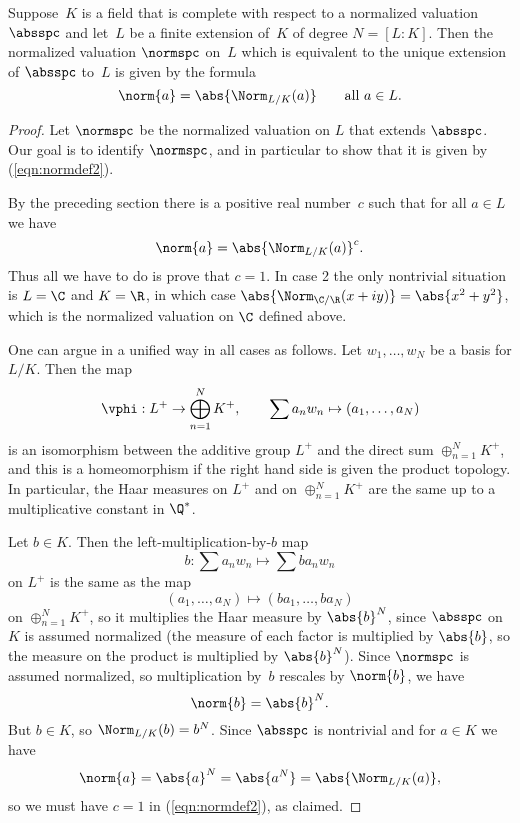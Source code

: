 \documentclass[11pt]{book}
\begin{document}
\begin{ch}
\begin{lemma}
  Suppose~$K$ is a field that is complete with respect to a normalized
  valuation~$\absspc$ and let~$L$ be a finite extension of~$K$ of
  degree $N=[L:K]$.  Then the normalized valuation $\normspc$ on~$L$
  which is equivalent to the unique extension of $\absspc$ to~$L$ is
  given by the formula
\begin{equation}\label{eqn:normdef2}
 \norm{a} = \abs{\Norm_{L/K}(a)}\qquad \text{all } a\in L.
\end{equation}
\end{lemma}
\begin{proof}
Let $\normspc$ be the normalized valuation on $L$ that extends $\absspc$.
Our goal is to identify $\normspc$, and in particular to show
that it is given by (\ref{eqn:normdef2}).

By the preceding section there is a positive real number~$c$
such that for all $a\in L$ we have
$$\norm{a} = \abs{\Norm_{L/K}(a)}^c.$$
Thus all we have to do is prove that $c=1$.
In case 2 the only nontrivial situation is $L=\C$ and $K=\R$,
in which case $\abs{\Norm_{\C/\R}(x+iy)} = \abs{x^2+y^2}$,
which is the normalized valuation on $\C$ defined above.

One can argue in a unified way in all cases as follows.
Let $w_1,\ldots, w_N$ be a basis for $L/K$. Then the map
$$
  \vphi:L^+ \to \bigoplus_{n=1}^N K^+, \qquad
\sum a_n w_n \mapsto (a_1,\ldots, a_N)
$$
is an isomorphism between the additive group $L^+$
and the direct sum $\oplus_{n=1}^N K^+$, and
this is a homeomorphism if the right hand side
is given the product topology.  In particular, the
Haar measures on $L^+$ and on $\oplus_{n=1}^N K^+$
are the same up to a multiplicative constant in $\Q^*$.

Let $b\in K$.  Then the left-multiplication-by-$b$ map
$$
   b : \sum a_n w_n \mapsto \sum b a_n w_n
$$
on $L^+$ is the same as the map
$$
  (a_1,\ldots, a_N) \mapsto (ba_1,\ldots, ba_N)
$$
on $\oplus_{n=1}^N K^+$, so it multiplies the Haar
measure by $\abs{b}^N$, since $\absspc$ on~$K$
is assumed normalized (the measure of each factor
is multiplied by $\abs{b}$, so the measure on
the product is multiplied by $\abs{b}^N$).
Since $\normspc$ is assumed normalized, so
multiplication by~$b$ rescales by $\norm{b}$, we
have
$$
  \norm{b} = \abs{b}^N.
$$
But $b\in K$, so $\Norm_{L/K}(b) = b^N$.
Since $\absspc$ is nontrivial and for $a\in K$ we
have $$\norm{a} = \abs{a}^N = \abs{a^N} = \abs{\Norm_{L/K}(a)},$$
so we must have $c=1$ in (\ref{eqn:normdef2}), as claimed.
\end{proof}


\end{ch}
\end{document}
